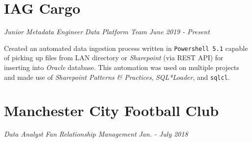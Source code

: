 \documentclass[letterpaper,11pt]{article}
\begin{document}

\section{IAG Cargo}
\textit{Junior Metadata Engineer}
\hfill
\textit{Data Platform Team}
\hfill
\textit{June 2019 - Present}
\begin{description}[style=multiline, leftmargin=3cm]
	\item[Oracle Ingestion Automation]
	Created an automated data ingestion process written in \texttt{Powershell 5.1} capable of picking up files from LAN directory or \textit{Sharepoint} (via REST API) for inserting into \textit{Oracle} database. 
	This automation was used on multiple projects and made use of \textit{Sharepoint Patterns \& Practices}, \textit{SQL*Loader}, and \texttt{sqlcl}.

	\item[Sales Reference db]
\end{description}


\section{Manchester City Football Club}
\textit{Data Analyst}
\hfill
\textit{Fan Relationship Management}
\hfill
\textit{Jan. - July 2018}
\end{document}
